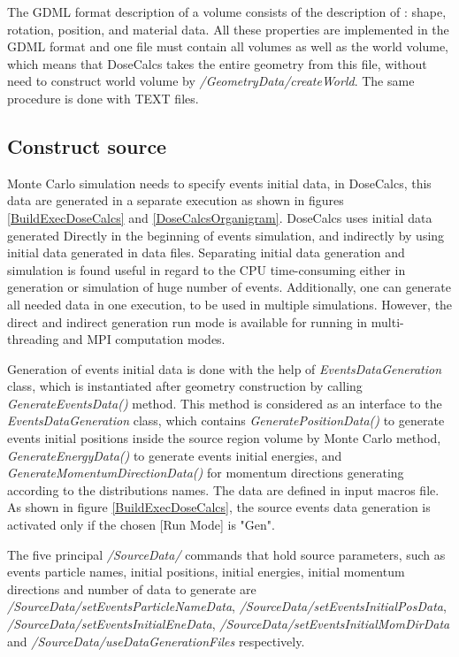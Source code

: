 \documentclass[letterpaper,12pt]{article}
\begin{document}
The GDML format description of a volume consists of the description of : shape, rotation, position, and material data. All these properties are implemented in the GDML format and one file must contain all volumes as well as the world volume, which means that DoseCalcs takes the entire geometry from this file, without need to construct world volume by \textit{/GeometryData/createWorld}. The same procedure is done with TEXT files.

\subsection{Construct source}

Monte Carlo simulation needs to specify events initial data, in DoseCalcs, this data are generated in a separate execution as shown in figures \ref{BuildExecDoseCalcs} and \ref{DoseCalcsOrganigram}. DoseCalcs uses initial data generated Directly in the beginning of events simulation, and indirectly by using initial data generated in data files. Separating initial data generation and simulation is found useful in regard to the CPU time-consuming either in generation or simulation of huge number of events. Additionally, one can generate all needed data in one execution, to be used in multiple simulations. However, the direct and indirect generation run mode is available for running in multi-threading and MPI computation modes. 

Generation of events initial data is done with the help of \textit{EventsDataGeneration} class, which is instantiated after geometry construction by calling \textit{GenerateEventsData()} method. This method is considered as an interface to the \textit{EventsDataGeneration} class, which contains \textit{GeneratePositionData()} to generate events initial positions inside the source region volume by Monte Carlo method, \textit{GenerateEnergyData()} to generate events initial energies, and \textit{GenerateMomentumDirectionData()} for momentum directions generating according to the distributions names. The data are defined in input macros file. As shown in figure \ref{BuildExecDoseCalcs}, the source events data generation is activated only if the chosen [Run Mode] is "Gen".

The five principal \textit{/SourceData/} commands that hold source parameters, such as events particle names, initial positions, initial energies, initial momentum directions and number of data to generate are \textit{/SourceData/setEventsParticleNameData}, \textit{/SourceData/setEventsInitialPosData}, \textit{/SourceData/setEventsInitialEneData}, \textit{/SourceData/setEventsInitialMomDirData} and \textit{/SourceData/useDataGenerationFiles} respectively.
\end{document}
